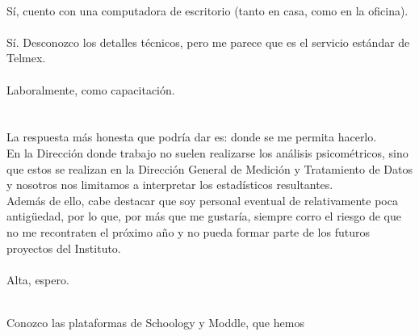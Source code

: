 \documentclass[11pt]{article}
\begin{document}
\begin{question}
\\
Sí, cuento con una computadora de escritorio (tanto en casa, como en la oficina).\\

\\
Sí. Desconozco los detalles técnicos, pero me parece que es el servicio estándar de Telmex.\\

\\
Laboralmente, como capacitación.\\

\\

\\
La respuesta más honesta que podría dar es: donde se me permita hacerlo.\\

En la Dirección donde trabajo no suelen realizarse los análisis psicométricos, sino que estos se realizan en la Dirección General de Medición y Tratamiento de Datos y nosotros nos limitamos a interpretar los estadísticos resultantes.\\

Además de ello, cabe destacar que soy personal eventual de relativamente poca antigüedad, por lo que, por más que me gustaría, siempre corro el riesgo de que no me recontraten el próximo año y no pueda formar parte de los futuros proyectos del Instituto.\\

\\
Alta, espero.

\\
Conozco las plataformas de Schoology y Moddle, que hemos


\end{question}
\end{document}
